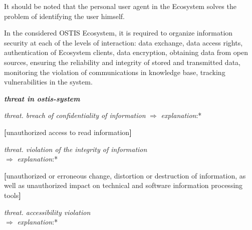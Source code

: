 \documentclass{article}
\begin{document}
\begin{multicols}{2}
It should be noted that the personal user agent in the
Ecosystem solves the problem of identifying the user
himself.
    \par
    In the considered OSTIS Ecosystem, it is required to
organize information security at each of the levels of
interaction: data exchange, data access rights, authentication of Ecosystem clients, data encryption, obtaining
data from open sources, ensuring the reliability and
integrity of stored and transmitted data, monitoring the
violation of communications in knowledge base, tracking
vulnerabilities in the system.
\vspace{0.7cm}
\par

\noindent \textit{\textbf{threat in ostis-system}}
 \begin{description}[leftmargin=!, labelwidth=1cm, itemsep=-1.5mm]
   \item[$\supset$] \textit {threat. breach of confidentiality of information}
   \hspace{0.5cm} $\Rightarrow$  \hspace{0.5cm} \textit{explanation}:* 
   \par \vspace{-0.1cm} \hspace{1cm} \textbf{[}unauthorized access to read information\textbf{]}
    \item[$\supset$] \textit {threat. violation of the integrity of information} \\
   \vspace{0.1cm} \hspace{-0.23cm}  $\Rightarrow$  \hspace{0.5cm} \textit{explanation}:* 
     \par
      \begin{description}[leftmargin=!, labelwidth=1cm, itemsep=-1.5mm]
     \item[ ] \vspace{-0.4cm} \textbf{[}unauthorized or erroneous change, distortion or destruction of information, as well
as unauthorized impact on technical and
software information processing tools\textbf{]}
\end{description}
 \item[$\supset$] \vspace{-0.2cm} \textit {threat. accessibility violation} \\
   \vspace{0.1cm} \hspace{-0.23cm}  $\Rightarrow$  \hspace{0.5cm} \textit{explanation}:* 

\end{description}
\end{multicols}
\end{document}
